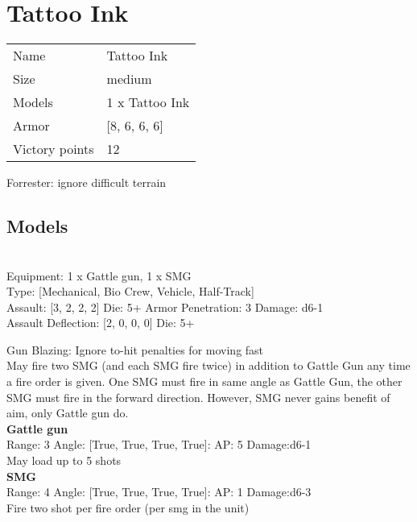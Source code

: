 \pagebreak

\section{ Tattoo Ink }

\begin{tabular}{ll}
  Name & Tattoo Ink \\
  Size & medium\\
  Models & 1 x Tattoo Ink\\
  Armor & [8, 6, 6, 6]\\
  Victory points & 12\\
\end{tabular}

Forrester: ignore difficult terrain\\ 


\subsection{ Models }

 \\
Equipment: 1 x Gattle gun, 1 x SMG \\
Type: [Mechanical, Bio Crew, Vehicle, Half-Track] \\

Assault: [3, 2, 2, 2] Die: 5+ Armor Penetration: 3 Damage: d6-1 \\
Assault Deflection: [2, 0, 0, 0] Die: 5+\\
\indent  

Gun Blazing: Ignore to-hit penalties for moving fast\\ 
May fire two SMG (and each SMG fire twice) in addition to Gattle Gun any time a fire order is given. One SMG must fire in same angle as Gattle Gun, the other SMG must fire in the forward direction. However, SMG never gains benefit of aim, only Gattle gun do.\\ 


{\bf Gattle gun } \\



Range: 3  Angle: [True, True, True, True]: AP: 5 Damage:d6-1 \\
May load up to 5 shots\\ 




{\bf SMG } \\



Range: 4  Angle: [True, True, True, True]: AP: 1 Damage:d6-3 \\
Fire two shot per fire order (per smg in the unit)\\ 




